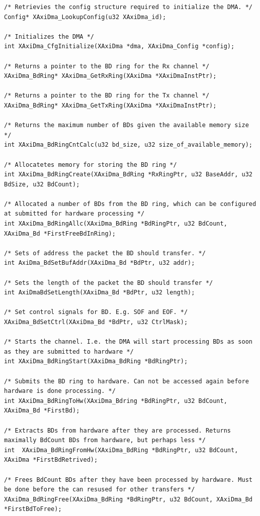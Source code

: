 \begin{lstlisting}
/* Retrievies the config structure required to initialize the DMA. */
Config* XAxiDma_LookupConfig(u32 XAxiDma_id);

/* Initializes the DMA */
int XAxiDma_CfgInitialize(XAxiDma *dma, XAxiDma_Config *config);

/* Returns a pointer to the BD ring for the Rx channel */
XAxiDma_BdRing* XAxiDma_GetRxRing(XAxiDma *XAxiDmaInstPtr);

/* Returns a pointer to the BD ring for the Tx channel */
XAxiDma_BdRing* XAxiDma_GetTxRing(XAxiDma *XAxiDmaInstPtr);

/* Returns the maximum number of BDs given the available memory size */
int XAxiDma_BdRingCntCalc(u32 bd_size, u32 size_of_available_memory);

/* Allocatetes memory for storing the BD ring */
int XAxiDma_BdRingCreate(XAxiDma_BdRing *RxRingPtr, u32 BaseAddr, u32 BdSize, u32 BdCount);

/* Allocated a number of BDs from the BD ring, which can be configured at submitted for hardware processing */
int XAxiDma_BdRingAllc(XAxiDma_BdRing *BdRingPtr, u32 BdCount, XAxiDma_Bd *FirstFreeBdInRing);

/* Sets of address the packet the BD should transfer. */
int AxiDma_BdSetBufAddr(XAxiDma_Bd *BdPtr, u32 addr);

/* Sets the length of the packet the BD should transfer */
int AxiDmaBdSetLength(XAxiDma_Bd *BdPtr, u32 length);

/* Set control signals for BD. E.g. SOF and EOF. */
XAxiDma_BdSetCtrl(XAxiDma_Bd *BdPtr, u32 CtrlMask);

/* Starts the channel. I.e. the DMA will start processing BDs as soon as they are submitted to hardware */
int XAxiDma_BdRingStart(XAxiDma_BdRing *BdRingPtr);

/* Submits the BD ring to hardware. Can not be accessed again before hardware is done processing. */
int XAxiDma_BdRingToHw(XAxiDma_Bdring *BdRingPtr, u32 BdCount, XAxiDma_Bd *FirstBd);

/* Extracts BDs from hardware after they are processed. Returns maximally BdCount BDs from hardware, but perhaps less */
int  XAxiDma_BdRingFromHw(XAxiDma_BdRing *BdRingPtr, u32 BdCount, XAxiDma *FirstBdRetrived);

/* Frees BdCount BDs after they have been processed by hardware. Must be done before the can resused for other transfers */
XAxiDma_BdRingFree(XAxiDma_BdRing *BdRingPtr, u32 BdCount, XAxiDma_Bd *FirstBdToFree);
\end{lstlisting}

